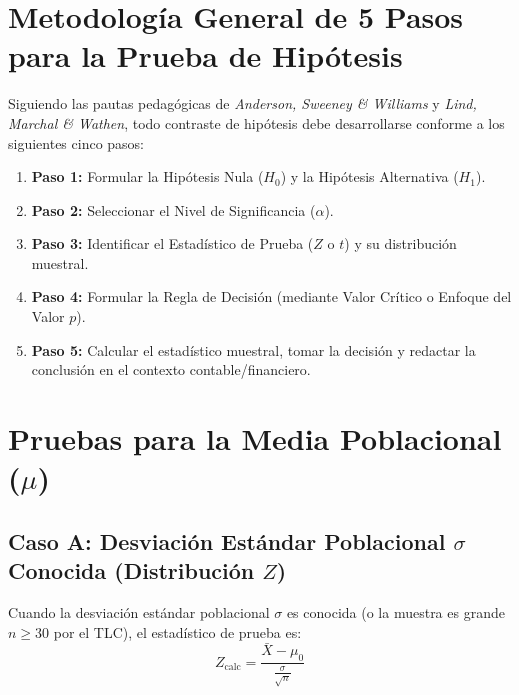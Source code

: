 \section{Metodología General de 5 Pasos para la Prueba de Hipótesis}
Siguiendo las pautas pedagógicas de \textit{Anderson, Sweeney \& Williams} y \textit{Lind, Marchal \& Wathen}, todo contraste de hipótesis debe desarrollarse conforme a los siguientes cinco pasos:

\begin{formulario}
\begin{enumerate}
    \item \textbf{Paso 1:} Formular la Hipótesis Nula ($H_0$) y la Hipótesis Alternativa ($H_1$).
    \item \textbf{Paso 2:} Seleccionar el Nivel de Significancia ($\alpha$).
    \item \textbf{Paso 3:} Identificar el Estadístico de Prueba ($Z$ o $t$) y su distribución muestral.
    \item \textbf{Paso 4:} Formular la Regla de Decisión (mediante Valor Crítico o Enfoque del Valor $p$).
    \item \textbf{Paso 5:} Calcular el estadístico muestral, tomar la decisión y redactar la conclusión en el contexto contable/financiero.
\end{enumerate}
\end{formulario}

\section{Pruebas para la Media Poblacional ($\mu$)}

\subsection{Caso A: Desviación Estándar Poblacional $\sigma$ Conocida (Distribución $Z$)}
Cuando la desviación estándar poblacional $\sigma$ es conocida (o la muestra es grande $n \ge 30$ por el TLC), el estadístico de prueba es:
\begin{equation}
    Z_{\text{calc}} = \frac{\bar{X} - \mu_0}{\frac{\sigma}{\sqrt{n}}}
\end{equation}

